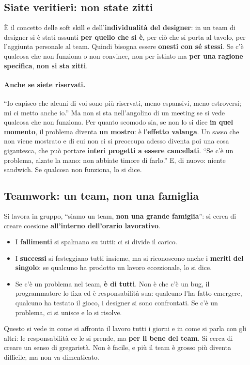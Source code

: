 \subsection{Siate veritieri: non state zitti}

È il concetto delle soft skill e dell'\textbf{individualità del designer}:
in un team di designer si è stati assunti \textbf{per quello che si è}, per
ciò che si porta al tavolo, per l'aggiunta personale al team. Quindi bisogna
essere \textbf{onesti con sé stessi}. Se c'è qualcosa che non funziona o non
convince, non per istinto ma \textbf{per una ragione specifica},
\textbf{non si sta zitti}.

\paragraph{Anche se siete riservati.} ``Io capisco che alcuni di voi sono
più riservati, meno espansivi, meno estroversi; mi ci metto anche io.'' Ma
non si sta nell'angolino di un meeting se si vede qualcosa che non funziona.
Per quanto scomodo sia, se non lo si dice \textbf{in quel momento}, il
problema diventa \textbf{un mostro}: è l'\textbf{effetto valanga}. Un sasso
che non viene mostrato e di cui non ci si preoccupa adesso diventa poi una
cosa gigantesca, che può portare \textbf{interi progetti a essere
cancellati}. ``Se c'è un problema, alzate la mano: non abbiate timore di
farlo.'' E, di nuovo: niente sandwich. Se qualcosa non funziona, lo si dice.

\subsection{Teamwork: un team, non una famiglia}

Si lavora in gruppo, ``siamo un team, \textbf{non una grande famiglia}'':
si cerca di creare coesione \textbf{all'interno dell'orario lavorativo}.
\begin{itemize}
  \item I \textbf{fallimenti} si spalmano su tutti: ci si divide il carico.
  \item I \textbf{successi} si festeggiano tutti insieme, ma si
        riconoscono anche i \textbf{meriti del singolo}: se qualcuno ha
        prodotto un lavoro eccezionale, lo si dice.
  \item Se c'è un problema nel team, \textbf{è di tutti}. Non è che c'è un
        bug, il programmatore lo fixa ed è responsabilità sua: qualcuno l'ha
        fatto emergere, qualcuno ha testato il gioco, i designer si sono
        confrontati. Se c'è un problema, ci si unisce e lo si risolve.
\end{itemize}
Questo si vede in come si affronta il lavoro tutti i giorni e in come si
parla con gli altri: le responsabilità ce le si prende, ma \textbf{per il
bene del team}. Si cerca di creare un senso di gregarietà. Non è facile, e
più il team è grosso più diventa difficile; ma non va dimenticato.

